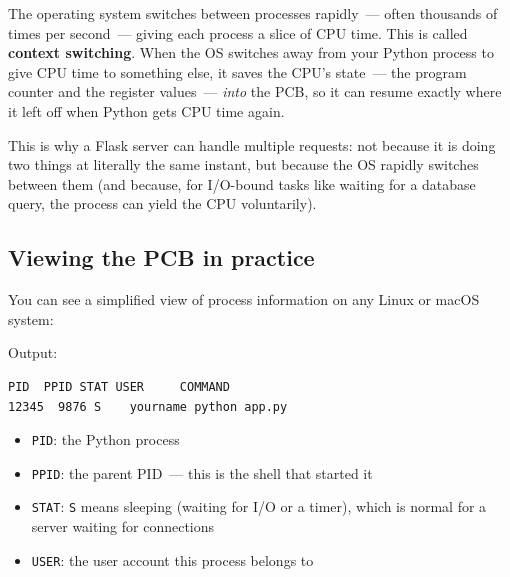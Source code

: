 The operating system switches between processes rapidly~--- often thousands of times per second~--- giving each process a slice of CPU time. This is called \textbf{context switching}. When the OS switches away from your Python process to give CPU time to something else, it saves the CPU's state~--- the program counter and the register values~--- \emph{into} the PCB, so it can resume exactly where it left off when Python gets CPU time again.

This is why a Flask server can handle multiple requests: not because it is doing two things at literally the same instant, but because the OS rapidly switches between them (and because, for I/O-bound tasks like waiting for a database query, the process can yield the CPU voluntarily).

\subsection*{Viewing the PCB in practice}\label{01-command-to-process:viewing-the-pcb-in-practice}

You can see a simplified view of process information on any Linux or macOS system:

\begin{codebox}[short]

\begin{Shaded}
\begin{Highlighting}[]
  \VariableTok{$(}\VariableTok{)} 
\end{Highlighting}
\end{Shaded}

\end{codebox}

\noindent{}Output:

\begin{outputbox}[short]
\begin{Verbatim}[fontsize=\codesize, breaklines, breakanywhere, breaksymbolleft={\tiny\textcolor{muted}{$\hookrightarrow$}}]
  PID  PPID STAT USER     COMMAND
12345  9876 S    yourname python app.py
\end{Verbatim}
\end{outputbox}

\begin{itemize}
\tightlist
\item
  \texttt{PID}: the Python process
\item
  \texttt{PPID}: the parent PID~--- this is the shell that started it
\item
  \texttt{STAT}: \texttt{S} means sleeping (waiting for I/O or a timer), which is normal for a server waiting for connections
\item
  \texttt{USER}: the user account this process belongs to
\end{itemize}

